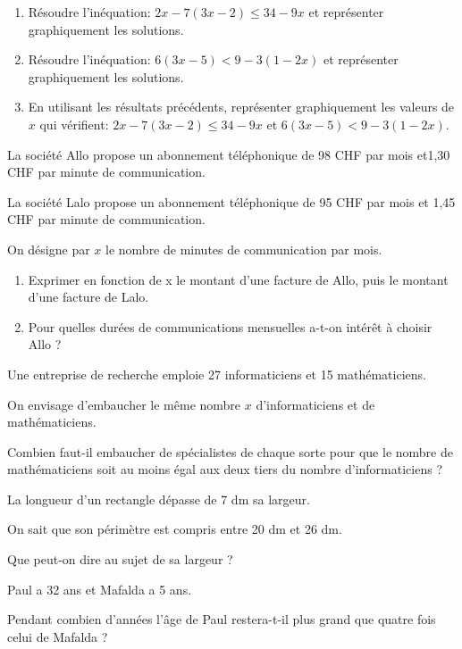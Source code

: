 \begin{exercice}
\begin{enumerate}
\item Résoudre l'inéquation: $2x-7(3x-2)\leq 34 - 9 x$ et représenter graphiquement les solutions.
\item Résoudre l'inéquation: $6(3x-5) < 9-3(1-2x)$ et représenter graphiquement les solutions.
\item En utilisant les résultats précédents, représenter graphiquement les valeurs de $x$ qui vérifient: $2x-7(3x-2)\leq 34 - 9 x$ et $6(3x-5) < 9-3(1-2x)$.
\end{enumerate}
\end{exercice}


\begin{exercice}
La société Allo propose un abonnement téléphonique de 98 CHF par mois et1,30 CHF par minute de communication. 

La société Lalo propose un abonnement téléphonique de 95 CHF par mois et 1,45 CHF  par minute de communication.

On désigne par $x$  le nombre de minutes de communication par mois.

\begin{enumerate}
\item Exprimer en fonction de x  le montant d’une facture de Allo, puis le montant d’une facture de Lalo.
\item Pour quelles durées de communications mensuelles a-t-on intérêt à choisir Allo ?
\end{enumerate}
\end{exercice}

\begin{exercice}
Une entreprise de recherche emploie 27 informaticiens et 15 mathématiciens. 

On envisage d’embaucher le même nombre $x$  d’informaticiens et de mathématiciens.

Combien faut-il embaucher de spécialistes de chaque sorte pour que le nombre de mathématiciens soit au moins égal aux deux tiers du nombre d’informaticiens ?
\end{exercice}

\begin{exercice}
La longueur d’un rectangle dépasse de 7 dm sa largeur. 

On sait que son périmètre est compris entre 20 dm et 26 dm. 

Que peut-on dire au sujet de sa largeur ? 
\end{exercice}

\begin{exercice}
Paul a 32 ans et Mafalda a 5 ans. 

Pendant combien d’années l’âge de Paul restera-t-il plus grand que quatre fois celui de Mafalda ?  
\end{exercice}